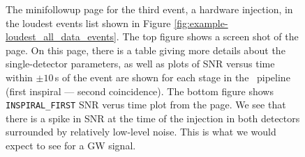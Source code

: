 \begin{figure}[p]
\center
{}
\label{fig:sample-minifup_hardware_inj}
\caption{The minifollowup page for the third event, a hardware injection, in
the loudest events list shown in Figure
\ref{fig:example-loudest_all_data_events}. The top figure shows a screen shot
of the page. On this page, there is a table giving more details about the
single-detector parameters, as well as plots of SNR versus time within $\pm
10\,$s of the event are shown for each stage in the \hipe~pipeline (first
inspiral --- second coincidence). The bottom figure shows
\texttt{INSPIRAL\_FIRST} SNR verus time plot from the page. We see that there
is a spike in SNR at the time of the injection in both detectors surrounded by
relatively low-level noise. This is what we would expect to see for a \ac{GW}
signal.}
\end{figure}

